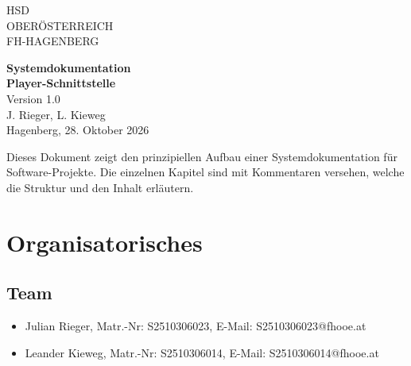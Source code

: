 \documentclass[a4paper,12pt]{article}
\begin{document}





\begin{titlepage}
\vspace*{-1cm}
\noindent
HSD\\
OBERÖSTERREICH\\
FH-HAGENBERG

\vspace{4cm}
\begin{center}
{\Huge \textbf{Systemdokumentation}}\\[1cm]
{\Large \textbf{Player-Schnittstelle}}\\[0.5cm]
{\large Version 1.0}\\[2cm]
{\large J. Rieger, L. Kieweg}\\[0.5cm]
{\large Hagenberg, 28. Oktober 2026}
\end{center}

\vspace{3cm}
\noindent
Dieses Dokument zeigt den prinzipiellen Aufbau einer Systemdokumentation für Software-Projekte. Die einzelnen Kapitel sind mit Kommentaren versehen, welche die Struktur und den Inhalt erläutern.
\end{titlepage}

\newpage
\tableofcontents
\newpage

\section{Organisatorisches}
\subsection {Team}
\begin{itemize}
\item Julian Rieger, Matr.-Nr: S2510306023, E-Mail: S2510306023@fhooe.at
\item Leander Kieweg, Matr.-Nr: S2510306014, E-Mail: S2510306014@fhooe.at
\end{itemize}
\end{document}
